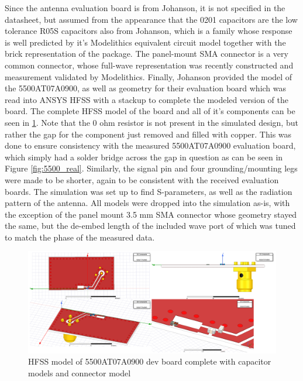 \documentclass[12pt]{usfcoe}
\begin{document}
    Since the antenna evaluation board is from Johanson, it is not specified in the datasheet, but assumed from the appearance that the 0201 capacitors are the low tolerance R05S capacitors also from Johanson, which is a family whose response is well predicted by it's Modelithics equivalent circuit model together with the brick representation of the package.
    The panel-mount SMA connector is a very common connector, whose full-wave representation was recently constructed and measurement validated by Modelithics.
    Finally, Johanson provided the model of the 5500AT07A0900, as well as geometry for their evaluation board which was read into ANSYS HFSS with a stackup to complete the modeled version of the board. 
    The complete HFSS model of the board and all of it's components can be seen in \ref{fig:5500_hfss_model}.
    Note that the 0 ohm resistor is not present in the simulated design, but rather the gap for the component just removed and filled with copper.
    This was done to ensure consistency with the measured 5500AT07A0900 evaluation board, which simply had a solder bridge across the gap in question as can be seen in Figure \ref{fig:5500_real}.
    Similarly, the signal pin and four grounding/mounting legs were made to be shorter, again to be consistent with the received evaluation boards. 
    The simulation was set up to find S-parameters, as well as the radiation pattern of the antenna. 
    All models were dropped into the simulation as-is, with the exception of the panel mount 3.5 mm SMA connector whose geometry stayed the same, but the de-embed length of the included wave port of which was tuned to match the phase of the measured data.

    \begin{figure}
		\begin{center}
        	\includegraphics[width=\textwidth]{images/5500_simulation/model.png} 
			\caption{HFSS model of 5500AT07A0900 dev board complete with capacitor models and connector model} 
			\label{fig:5500_hfss_model}
		\end{center}
    \end{figure}    
    
\end{document}
